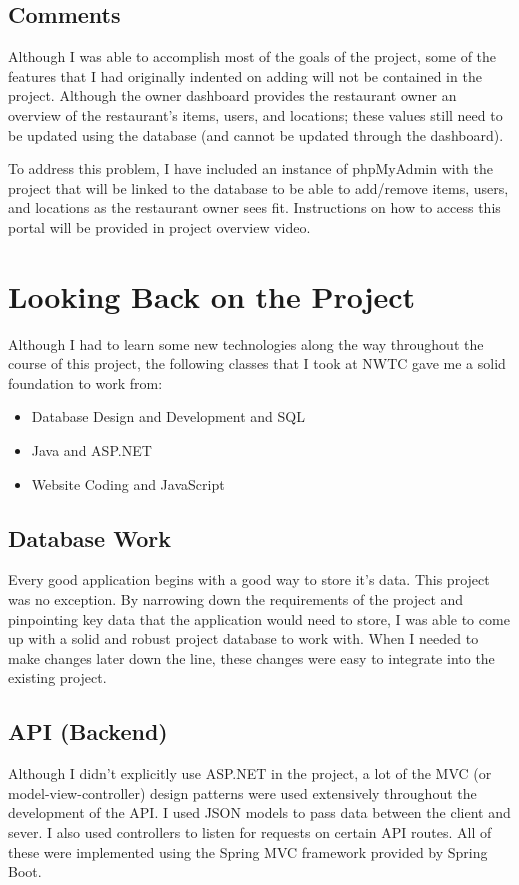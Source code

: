 \documentclass[letterpaper,11pt]{../../templates/texMemo}
\begin{document}
    \subsection{Comments}
    Although I was able to accomplish most of the goals of the project, some of the features that I had originally indented on adding will not be contained in the project. Although the owner dashboard provides the restaurant owner an overview of the restaurant's items, users, and locations; these values still need to be updated using the database (and cannot be updated through the dashboard).

    To address this problem, I have included an instance of phpMyAdmin with the project that will be linked to the database to be able to add/remove items, users, and locations as the restaurant owner sees fit. Instructions on how to access this portal will be provided in project overview video.


    \section{Looking Back on the Project}
    Although I had to learn some new technologies along the way throughout the course of this project, the following classes that I took at NWTC gave me a solid foundation to work from:

    \begin{itemize}
        \item Database Design and Development and SQL
        \item Java and ASP.NET
        \item Website Coding and JavaScript
    \end{itemize}

    \subsection{Database Work}
    Every good application begins with a good way to store it's data. This project was no exception. By narrowing down the requirements of the project and pinpointing key data that the application would need to store, I was able to come up with a solid and robust project database to work with. When I needed to make changes later down the line, these changes were easy to integrate into the existing project.

    \subsection{API (Backend)}
    Although I didn't explicitly use ASP.NET in the project, a lot of the MVC (or model-view-controller) design patterns were used extensively throughout the development of the API. I used JSON models to pass data between the client and sever. I also used controllers to listen for requests on certain API routes. All of these were implemented using the Spring MVC framework provided by Spring Boot.
\end{document}
